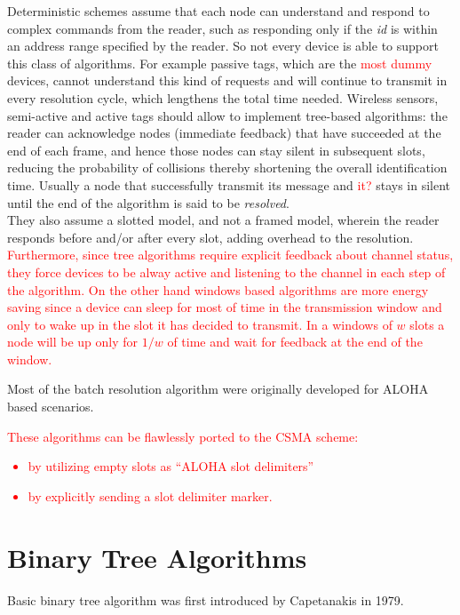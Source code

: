 \documentclass[12pt,a4paper]{report}
\begin{document}
Deterministic schemes assume that each node can understand and respond to complex commands from the reader, such as responding only if the \emph{id} is within an address range specified by the reader. So not every device is able to support this class of algorithms. For example passive tags, which are the \textcolor{red}{most dummy} devices, cannot understand this kind of requests and will continue to transmit in every resolution cycle, which lengthens the total time needed. Wireless sensors, semi-active and active tags should allow to implement tree-based algorithms: the reader can acknowledge nodes (immediate feedback) that have succeeded at the end of each frame, and hence those nodes can stay silent in subsequent slots, reducing the probability of collisions thereby shortening the overall identification time. Usually a node that successfully transmit its message and \textcolor{red}{it?} stays in silent until the end of the algorithm is said to be \emph{resolved}.\\
They also assume a slotted model, and not a framed model, wherein the reader responds before and/or after every slot, adding overhead to the resolution.\\
\textcolor{red}{
Furthermore, since tree algorithms require explicit feedback about channel status, they force devices to be alway active and listening to the channel in each step of the algorithm.
On the other hand windows based algorithms are more energy saving since a device can sleep for most of time in the transmission window and only to wake up in the slot it has decided to transmit. In a windows of $w$ slots  a node will be up only for $1/w$ of time and wait for feedback at the end of the window.}


Most of the batch resolution algorithm were originally developed for ALOHA based scenarios.\\
\textcolor{red}{
These algorithms can be flawlessly ported to the CSMA scheme:
\begin{itemize}
\item by utilizing empty slots as ``ALOHA slot delimiters''
\item by explicitly sending a slot delimiter marker.
\end{itemize}
} 
 
\section{Binary Tree Algorithms}
Basic binary tree algorithm was first introduced by Capetanakis in 1979.
\end{document}
